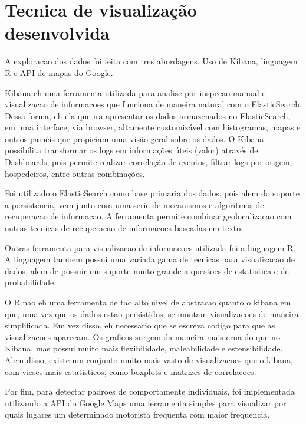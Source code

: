 \documentclass[10pt, conference]{IEEEtran}
\begin{document}
\section{Tecnica de visualização desenvolvida}
\label{sec:technique}
%

A exploracao dos dados foi feita com tres abordagens. Uso de Kibana, linguagem R
e API de mapas do Google.

Kibana eh uma ferramenta utilizada para analise por inspecao manual e visualizacao
de informacoes que funciona de maneira natural com o ElasticSearch. Dessa  forma, 
eh  ela  que ira apresentar os dados armazenados no ElasticSearch, em uma interface,  via
browser, altamente customizável com histogramas, mapas e outros painéis que propiciam uma visão
geral sobre os dados.  O Kibana possibilita transformar os logs em informações úteis (valor)
através  de Dashboards,  pois  permite  realizar  correlação  de  eventos,  filtrar logs
por  origem, hospedeiros, entre outras combinações.

Foi utilizado o ElasticSearch como base primaria dos dados, pois alem do suporte a persistencia,
vem junto com uma serie de mecanismos e algoritmos de recuperacao de informacao. A ferramenta
permite combinar geolocalizacao com outras tecnicas de recuperacao de informacoes baseadas
em texto.

Outras ferramenta para visualizacao de informacoes utilizada foi a linguagem R. A linguagem
tambem possui uma variada gama de tecnicas para visualizacao de dados, alem de possuir um
suporte muito grande a questoes de estatistica e de probabilidade. 

O R nao eh uma ferramenta de tao alto nivel de abstracao quanto o kibana em que, uma vez
que os dados estao persistidos, se montam visualizacoes de maneira simplificada. Em
vez disso, eh necessario
que se escreva codigo para que as visualizacoes aparecam. Os graficos surgem da maneira
mais crua do que no Kibana, mas possui muito mais flexibilidade, maleabilidade
e estensibilidade. Alem disso, existe um conjunto muito mais vasto de visualizacoes
que o kibana, com vieses mais estatisticos, como boxplots e matrizes de correlacoes.

Por fim, para detectar padroes de comportamente individuais, foi implementada utilizando
a API do Google Maps uma ferramenta simples para visualizar por quais lugares um determinado
motorista frequenta com maior frequencia.

\end{document}
